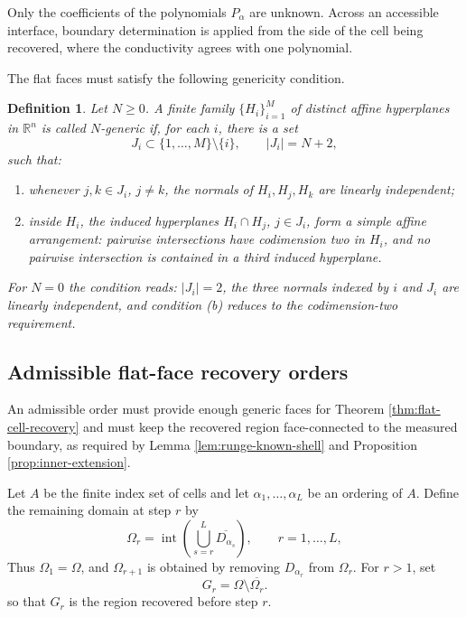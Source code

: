 \documentclass[10pt,a4paper]{amsart}
\newtheorem{definition}[theorem]{Definition}
\newcommand{\R}{\mathbb R}
\begin{document}
Only the coefficients of the polynomials \(P_\alpha\) are unknown.  Across an
accessible interface, boundary determination is applied from the side of the
cell being recovered, where the conductivity agrees with one polynomial.


The flat faces must satisfy the following genericity condition.


\begin{definition}
\label{def:N-generic}
Let \(N\ge0\).  A finite family \(\{H_i\}_{i=1}^M\) of distinct affine
hyperplanes in \(\R^n\) is called \(N\)-generic if, for each \(i\), there is a
set
\begin{equation}
  J_i\subset \{1,\ldots,M\}\setminus\{i\},
  \qquad |J_i|=N+2,
\end{equation}
such that:
\begin{enumerate}[label=(\alph*)]
  \item whenever \(j,k\in J_i\), \(j\ne k\), the normals of
  \(H_i,H_j,H_k\) are linearly independent;
  \item inside \(H_i\), the induced hyperplanes
  \(H_i\cap H_j\), \(j\in J_i\), form a simple affine arrangement: pairwise
  intersections have codimension two in \(H_i\), and no pairwise intersection
  is contained in a third induced hyperplane.
\end{enumerate}
For \(N=0\) the condition reads: \(|J_i|=2\), the three normals indexed by
\(i\) and \(J_i\) are linearly independent, and condition (b) reduces to the
codimension-two requirement.
\end{definition}


\subsection{Admissible flat-face recovery orders}
\label{sec:admissible-order}

An admissible order must provide enough generic faces for Theorem
\ref{thm:flat-cell-recovery} and must keep the recovered region
face-connected to the measured boundary, as required by Lemma
\ref{lem:runge-known-shell} and Proposition \ref{prop:inner-extension}.

Let \(A\) be the finite index set of cells and let
\(\alpha_1,\ldots,\alpha_L\) be an ordering of \(A\).  Define the remaining
domain at step \(r\) by
\begin{equation}
  \Omega_r=\operatorname{int}\left(
  \bigcup_{s=r}^L \overline{D_{\alpha_s}}\right),
  \qquad r=1,\ldots,L,
  \label{eq:remaining-domain}
\end{equation}
Thus \(\Omega_1=\Omega\), and \(\Omega_{r+1}\) is obtained by removing
\(D_{\alpha_r}\) from \(\Omega_r\).  For \(r>1\), set
\begin{equation}
  G_r=\Omega\setminus\overline{\Omega_r}.
\end{equation}
so that \(G_r\) is the region recovered before step \(r\).
\end{document}
